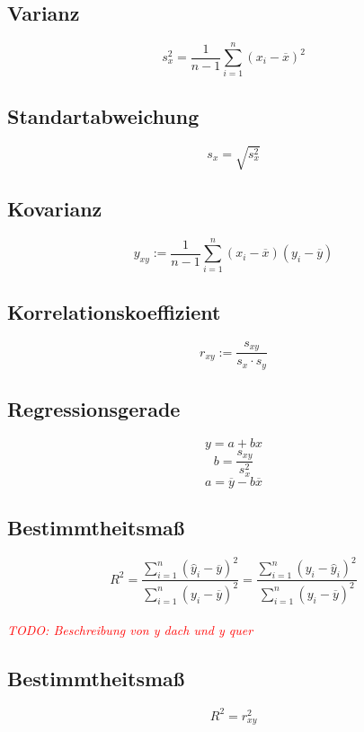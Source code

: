 \documentclass[12pt]{article}
\newcommand\todo[1]{\textit{\textcolor{red}{\\TODO: #1}}}
\begin{document}
\subsection{Varianz}
\begin{equation}
	s_x^2= \frac{1}{n-1}\sum_{i=1}^n{(x_i-\overline{x})^2}
\end{equation}
\subsection{Standartabweichung}
\begin{equation}
	s_x = \sqrt{s_x^2}
\end{equation}
\subsection{Kovarianz}
\begin{equation}
	y_{xy}:=\frac{1}{n-1}\sum_{i=1}^n(x_i-\overline{x})(y_i-\overline{y})
\end{equation}
\subsection{Korrelationskoeffizient}
\begin{equation}
	r_{xy}:=\frac{s_{xy}}{s_x\cdot s_y}
\end{equation}
\subsection{Regressionsgerade}
\begin{equation}
	y = a + bx
\end{equation}
\begin{equation}
	b = \frac{s_{xy}}{s_x^2}
\end{equation}
\begin{equation}
	a = \overline{y} - b\overline{x}
\end{equation}
\subsection{Bestimmtheitsmaß}
\begin{equation}
	R^2 = \frac{\sum_{i=1}^n (\hat{y}_i-\overline{y})^2}{\sum_{i=1}^n (y_i-\overline{y})^2} = \frac{\sum_{i=1}^n (y_i - \hat{y}_i)^2}{\sum_{i=1}^n (y_i-\overline{y})^2}
\end{equation}
\todo{Beschreibung von y dach und y quer}
\subsection{Bestimmtheitsmaß}
\begin{equation}
	R^2 = r_{xy}^2
\end{equation}
\end{document}
